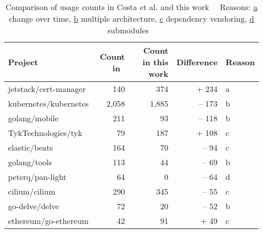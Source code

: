 \begin{table}[h]
    \centering
    \caption[Comparison of \unsafe{} usage counts Costa et al. and this work]%
    {Comparison of \unsafe{} usage counts in Costa et al. and this work~\newline \tiny ~\newline \footnotesize
    Reasons: \underline{a} change over time, \underline{b} multiple architecture, \underline{c} dependency vendoring,
    \underline{d} submodules \tiny ~\newline}
    \label{tbl:costa-counts-comparison}
    \begin{tabular}{l|r|r|r|l}
        \textbf{Project}       & \textbf{Count in~\cite{costa2020}} & \textbf{Count in this work} & \textbf{Difference} & \textbf{Reason} \\
        \hline
        jetstack/cert-manager  &                                140 &                         374 &               + 234 &  a              \\
        \rowcolor{verylightgray}
        kubernetes/kubernetes  &                              2,058 &                       1,885 &              -- 173 &  b              \\
        golang/mobile          &                                211 &                          93 &              -- 118 &  b              \\
        \rowcolor{verylightgray}
        TykTechnologies/tyk    &                                 79 &                         187 &               + 108 &  c              \\
        elastic/beats          &                                164 &                          70 &               -- 94 &  c              \\
        \rowcolor{verylightgray}
        golang/tools           &                                113 &                          44 &               -- 69 &  b              \\
        peterq/pan-light       &                                 64 &                           0 &               -- 64 &  d              \\
        \rowcolor{verylightgray}
        cilium/cilium          &                                290 &                         345 &               -- 55 &  c              \\
        go-delve/delve         &                                 72 &                          20 &               -- 52 &  b              \\
        \rowcolor{verylightgray}
        ethereum/go-ethereum   &                                 42 &                          91 &                + 49 &  c              \\
    \end{tabular}
\end{table}